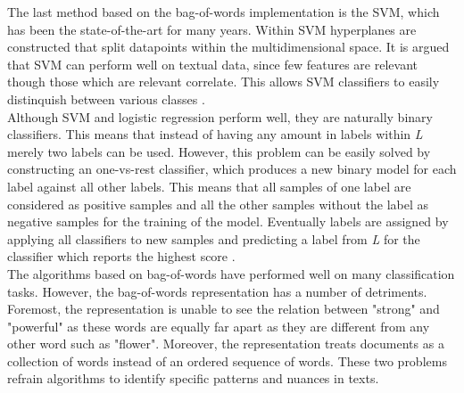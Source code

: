 The last method based on the bag-of-words implementation is the SVM, which has been the state-of-the-art for many years. Within SVM hyperplanes are constructed that split datapoints within the multidimensional space. It is argued that SVM can perform well on textual data, since few features are relevant though those which are relevant correlate. This allows SVM classifiers to easily distinquish between various classes \cite{joachims2001statistical}.\\
Although SVM and logistic regression perform well, they are naturally binary classifiers. This means that instead of having any amount in labels within \textit{L} merely two labels can be used. However, this problem can be easily solved by constructing an one-vs-rest classifier, which produces a new binary model for each label against all other labels. This means that all samples of one label are considered as positive samples and all the other samples without the label as negative samples for the training of the model. Eventually labels are assigned by applying all classifiers to new samples and predicting a label from \textit{L} for the classifier which reports the highest score \cite{aggarwal2012survey}.\\
The algorithms based on bag-of-words have performed well on many classification tasks. However, the bag-of-words representation has a number of detriments. Foremost, the representation is unable to see the relation between "strong" and "powerful" as these words are equally far apart as they are different from any other word such as "flower". Moreover, the representation treats documents as a collection of words instead of an ordered sequence of words. These two problems refrain algorithms to identify specific patterns and nuances in texts.

